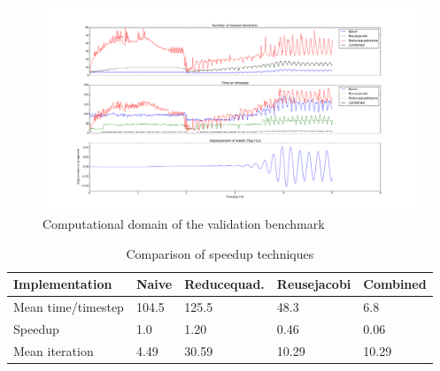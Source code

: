 \begin{figure}[h!]
\hspace*{-2.2cm}   
 \includegraphics[scale=0.36]{./Fig/itercompare.png}
 \caption{Computational domain of the validation benchmark}
\end{figure}

\begin{table}[h]
\centering
\caption{Comparison of speedup techniques }
\label{my-label}
\begin{tabular}{ |p{2.8cm}|p{2.4cm}||p{2.4cm}|p{2.4cm}|p{2.4cm}|  }
 \hline
Implementation &Naive  & Reducequad. & Reusejacobi & Combined \\
 \hline
 Mean time/timestep &   104.5 &  125.5 & 48.3  & 6.8   \\
 \hline
 Speedup & 1.0 &  1.20  & 0.46  & 0.06   \\
 \hline
 Mean iteration &  4.49 &  30.59 & 10.29  & 10.29   \\
 \hline
\end{tabular}
\end{table}
